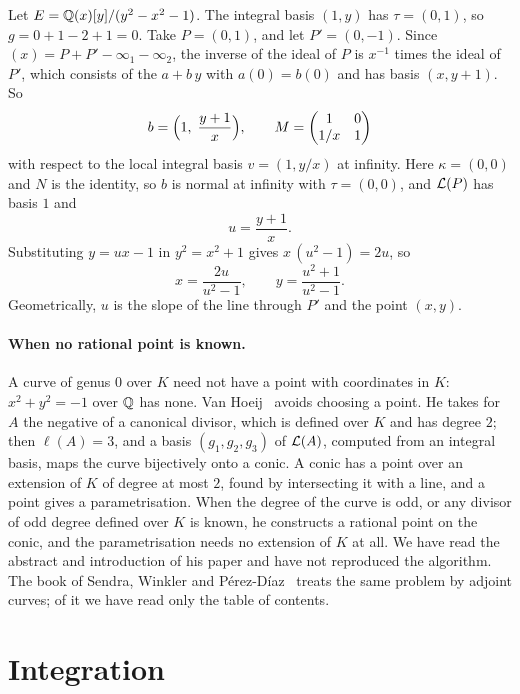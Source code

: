 \begin{example}\label{ex:g0-conic}
Let $E = \mathbb{Q}(x)[y]/(y^2 - x^2 - 1)$. The integral basis $(1, y)$ has $\tau =
(0, 1)$, so $g = 0 + 1 - 2 + 1 = 0$. Take $P = (0, 1)$, and let $P' = (0,
-1)$. Since $(x) = P + P' - \infty_1 - \infty_2$, the inverse of the ideal of
$P$ is $x^{-1}$ times the ideal of $P'$, which consists of the $a + b\,y$ with
$a(0) = b(0)$ and has basis $(x, y + 1)$. So
\[
  b = \Bigl( 1,\; \frac{y + 1}{x} \Bigr),
  \qquad M = \begin{pmatrix} 1 & 0 \\ 1/x & 1 \end{pmatrix}
\]
with respect to the local integral basis $v = (1, y/x)$ at infinity. Here
$\kappa = (0, 0)$ and $N$ is the identity, so $b$ is normal at infinity with
$\tau = (0, 0)$, and $\mathcal{L}(P)$ has basis $1$ and
\[
  u = \frac{y + 1}{x} .
\]
Substituting $y = u x - 1$ in $y^2 = x^2 + 1$ gives $x\,(u^2 - 1) = 2u$, so
\[
  x = \frac{2u}{u^2 - 1}, \qquad y = \frac{u^2 + 1}{u^2 - 1} .
\]
Geometrically, $u$ is the slope of the line through $P'$ and the point $(x,
y)$.
\end{example}

\paragraph{When no rational point is known.} A curve of genus $0$ over $K$
need not have a point with coordinates in $K$: $x^2 + y^2 = -1$ over $\mathbb{Q}$
has none. Van Hoeij~\cite{vanhoeij1997} avoids choosing a point. He takes
for $A$ the negative of a canonical divisor, which is defined over $K$ and
has degree $2$; then $\ell(A) = 3$, and a basis $(g_1, g_2, g_3)$ of $\mathcal{L}(A)$,
computed from an integral basis, maps the curve bijectively onto a conic. A
conic has a point over an extension of $K$ of degree at most $2$, found by
intersecting it with a line, and a point gives a parametrisation. When the
degree of the curve is odd, or any divisor of odd degree defined over $K$ is
known, he constructs a rational point on the conic, and the parametrisation
needs no extension of $K$ at all. We have read the abstract and introduction
of his paper and have not reproduced the algorithm. The book of Sendra,
Winkler and P\'erez-D\'iaz~\cite{sendra2008} treats the same problem by
adjoint curves; of it we have read only the table of contents.

\section{Integration}\label{sec:g0-integration}

